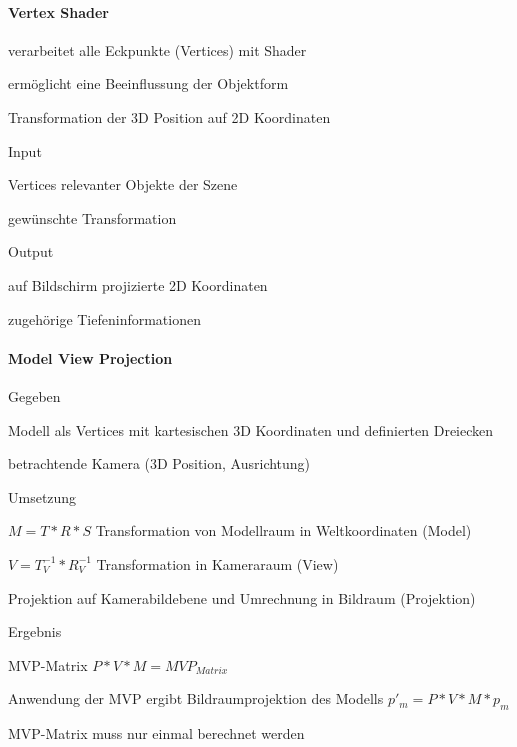 \documentclass[landscape]{article}
\begin{document}
\begin{multicols}{3}
  \paragraph{Vertex Shader}
  \begin{itemize*}
    \item verarbeitet alle Eckpunkte (Vertices) mit Shader
    \item ermöglicht eine Beeinflussung der Objektform
    \item Transformation der 3D Position auf 2D Koordinaten
    \item Input
          \begin{itemize*}
            \item Vertices relevanter Objekte der Szene
            \item gewünschte Transformation
          \end{itemize*}
    \item Output
          \begin{itemize*}
            \item auf Bildschirm projizierte 2D Koordinaten
            \item zugehörige Tiefeninformationen
          \end{itemize*}
  \end{itemize*}
  
  \paragraph{Model View Projection}
  \begin{itemize*}
    \item Gegeben
          \begin{itemize*}
            \item Modell als Vertices mit kartesischen 3D Koordinaten und definierten Dreiecken
            \item betrachtende Kamera (3D Position, Ausrichtung)
          \end{itemize*}
    \item Umsetzung
          \begin{enumerate*}
            \item $M=T*R*S$ Transformation von Modellraum in Weltkoordinaten (Model)
            \item $V=T_V^{-1}*R_V^{-1}$ Transformation in Kameraraum (View)
            \item Projektion auf Kamerabildebene und Umrechnung in Bildraum (Projektion)
          \end{enumerate*}
    \item Ergebnis
          \begin{itemize*}
            \item MVP-Matrix $P*V*M=MVP_{Matrix}$
            \item Anwendung der MVP ergibt Bildraumprojektion des Modells $p'_m=P*V*M*p_m$
            \item MVP-Matrix muss nur einmal berechnet werden
          \end{itemize*}
  \end{itemize*}
  

\end{multicols}
\end{document}
